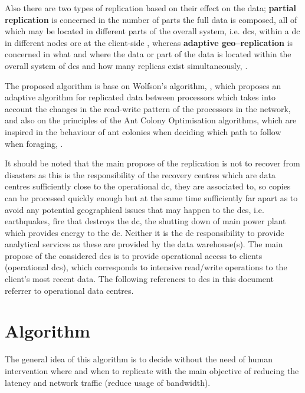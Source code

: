 \documentclass[english]{article}
\begin{document}
	Also there are two types of replication based on their effect on the data; {\bf partial replication} is concerned in the number of parts the full data is composed, all of which may be located in different parts of the overall system, i.e. \glspl{dc}, within a \gls{dc} in different nodes ore at the client-side \cite{Briquemont2015a, Briquemont2014a, Serrano2007a}, whereas {\bf adaptive geo--replication} is concerned in what and where the data or part of the data is located within the overall system of \glspl{dc} and how many replicas exist simultaneously, \cite{Jeon2014a, KingsyGrace2013a, Wang2012a, Abad2011a, Abdul-Wahid2007a, Loukopoulos2004a}.
	
	The proposed algorithm is base on Wolfson's algorithm, \cite{Wolfson1990a}, which proposes an adaptive algorithm for replicated data between processors which takes into account the changes in the read-write pattern of the processors in the network, and also on the principles of the Ant Colony Optimisation algorithms, which are inspired in the behaviour of ant colonies when deciding which path to follow when foraging, \cite{dorigo1992a}.
	
	It should be noted that the main propose of the replication is not to recover from disasters as this is the responsibility of the recovery centres which are data centres sufficiently close to the operational \gls{dc}, they are associated to, so copies can be processed quickly enough but at the same time sufficiently far apart as to avoid any potential geographical issues that may happen to the \glspl{dc}, i.e. earthquakes, fire that destroys the \gls{dc}, the shutting down of main power plant which provides energy to the \gls{dc}. Neither it is the \gls{dc} responsibility to provide analytical services as these are provided by the data warehouse(s). The main propose of the considered \glspl{dc} is to provide operational access to clients (operational \glspl{dc}), which corresponds to intensive read/write operations to the client's most recent data. The following references to \glspl{dc} in this document referrer to operational data centres.


\section{Algorithm}
The general idea of this algorithm is to decide without the need of human intervention where and when to replicate with the main objective of reducing the latency and network traffic (reduce usage of bandwidth).
\end{document}
